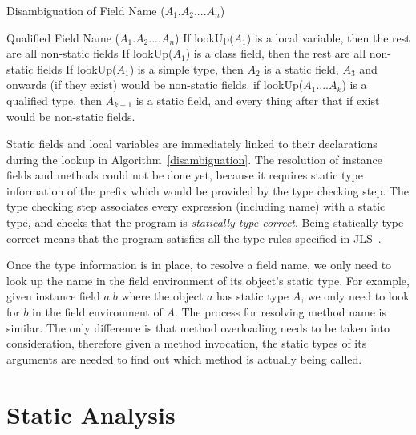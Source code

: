 \documentclass[a4paper, notitlepage]{report}
\begin{document}
\begin{algorithm}                      %
\caption{Disambiguation of Field Name ($A_1.A_2....A_n$)}          %
\label{disambiguation}                           %
\begin{algorithmic}[1]
\Require Qualified Field Name ($A_1.A_2....A_n$)
\State If lookUp($A_1$) is a local variable, then the rest are all non-static fields 
\State If lookUp($A_1$) is a  class field, then the rest are all non-static fields
\State If lookUp($A_1$) is a simple type, then $A_2$ is a static field, $A_3$ and onwards (if they exist) would be non-static fields.
\State if lookUp($A_1....A_k$) is a qualified type, then $A_{k+1}$ is a static field, and every thing after that if exist would be non-static fields.

\end{algorithmic}
\end{algorithm}

Static fields and local variables are immediately linked to their declarations during the lookup in Algorithm~\ref{disambiguation}. The resolution of instance fields and methods could not be done yet, because it requires static type information of the prefix which would be provided by the type checking step. The type checking step associates every expression (including name) with a static type, and checks that the program is \emph{statically type correct}. Being statically type correct means that the program satisfies all the type rules specified in JLS~\cite{gosling2000java}. 

Once the type information is in place, to resolve a field name, we only need to look up the name in the field environment of its object's static type. For example, given instance field $a.b$ where the object $a$ has static type $A$, we only need to look for $b$ in the field environment of $A$. The process for resolving method name is similar. The only difference is that method overloading needs to be taken into consideration, therefore given a method invocation, the static types of its arguments are needed to find out which method is actually being called.



\section{Static Analysis}
\end{document}
